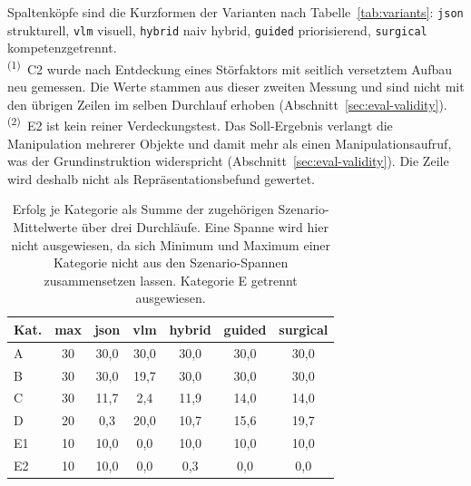 \begin{table}[ht]
  \vspace{2mm}
  {\footnotesize
  \begin{minipage}{0.97\linewidth}
  Spaltenköpfe sind die Kurzformen der Varianten nach Tabelle~\ref{tab:variants}:
  \texttt{json} strukturell, \texttt{vlm} visuell, \texttt{hybrid} naiv hybrid,
  \texttt{guided} priorisierend, \texttt{surgical} kompetenzgetrennt.\\[2pt]
  \textsuperscript{(1)}~C2 wurde nach Entdeckung eines Störfaktors mit seitlich
  versetztem Aufbau neu gemessen. Die Werte stammen aus dieser zweiten Messung
  und sind nicht mit den übrigen Zeilen im selben Durchlauf erhoben
  (Abschnitt~\ref{sec:eval-validity}).\\[2pt]
  \textsuperscript{(2)}~E2 ist kein reiner Verdeckungstest. Das Soll-Ergebnis
  verlangt die Manipulation mehrerer Objekte und damit mehr als einen
  Manipulationsaufruf, was der Grundinstruktion widerspricht
  (Abschnitt~\ref{sec:eval-validity}). Die Zeile wird deshalb nicht als
  Repräsentationsbefund gewertet.
  \end{minipage}}
\end{table}

\begin{table}[ht]
  \centering
  \caption{Erfolg je Kategorie als Summe der zugehörigen Szenario-Mittelwerte
           über drei Durchläufe. Eine Spanne wird hier nicht ausgewiesen, da
           sich Minimum und Maximum einer Kategorie nicht aus den
           Szenario-Spannen zusammensetzen lassen. Kategorie E getrennt
           ausgewiesen.}
  \label{tab:results-category}
  \small
  \setlength{\tabcolsep}{4pt}
  \begin{tabular}{l c ccccc}
    \toprule
    Kat. & max & json & vlm & hybrid & guided & surgical \\
    \midrule
    A          & 30 & 30{,}0 & 30{,}0 & 30{,}0 & 30{,}0 & 30{,}0 \\
    B          & 30 & 30{,}0 & 19{,}7 & 30{,}0 & 30{,}0 & 30{,}0 \\
    C          & 30 & 11{,}7 &  2{,}4 & 11{,}9 & 14{,}0 & 14{,}0 \\
    D          & 20 &  0{,}3 & 20{,}0 & 10{,}7 & 15{,}6 & 19{,}7 \\
    E1         & 10 & 10{,}0 &  0{,}0 & 10{,}0 & 10{,}0 & 10{,}0 \\
    E2         & 10 & 10{,}0 &  0{,}0 &  0{,}3 &  0{,}0 &  0{,}0 \\
    \bottomrule
  \end{tabular}
\end{table}

